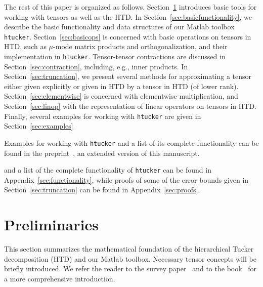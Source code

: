 \documentclass[11pt, a4paper]{article}
\newcommand{\htucker}{{\tt htucker}}
\begin{document}
The rest of this paper is organized as follows.
Section~\ref{sec:preliminaries} introduces basic tools for working
with tensors as well as the HTD.
In Section~\ref{sec:basicfunctionality}, we
describe the basic functionality and data structures of our {\sc
  Matlab} toolbox \htucker.  Section~\ref{sec:basicops} is concerned
with basic operations on tensors in HTD, such as $\mu$-mode matrix
products and orthogonalization, and their implementation in \htucker.
Tensor-tensor contractions are discussed in
Section~\ref{sec:contraction}, including, e.g., inner products.  In
Section~\ref{sec:truncation}, we present several methods for
approximating a tensor either given explicitly or given in HTD by a
tensor in HTD (of lower rank). Section~\ref{sec:elementwise} is
concerned with elementwise multiplication, and
Section~\ref{sec:linop} with the representation 
of linear operators on tensors in HTD.  Finally,
several examples for working with \htucker{} are given in
Section~\ref{sec:examples} %
\begin{submitted}

Examples for working with \htucker{} and a list of its complete functionality can be found in
the preprint~\cite{KreT11tr}, an extended version of this manuscript.
\end{submitted}
\begin{preprint}
  and a list of the complete functionality of \htucker{} can be found
  in Appendix~\ref{sec:functionality}, while proofs of some of the
  error bounds given in Section~\ref{sec:truncation} can be found in Appendix~\ref{sec:proofs}.
\end{preprint}



\section{Preliminaries} \label{sec:preliminaries}

This section summarizes the mathematical foundation of the hierarchical Tucker decomposition (HTD) 
and our {\sc Matlab} toolbox.
Necessary tensor concepts will be briefly introduced.  We
refer the reader to the survey paper~\cite{KolB09} and to the book~\cite{Hac12}
for a more comprehensive introduction.
\end{document}
